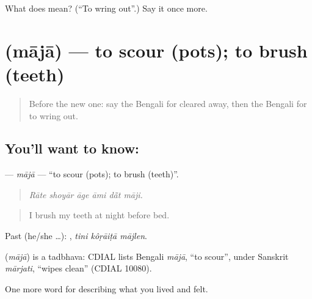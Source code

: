 \begin{tcolorbox}[breakable,colback=teal!4,colframe=teal!35!black,title={Before you move on}]
What does  mean? (\textquotedblleft{}To wring out\textquotedblright{}.) Say it once more.
\end{tcolorbox}
\section[\texorpdfstring{\bn{মাজা} (mājā)}{মাজা (mājā)}]{ (mājā) — to scour (pots); to brush (teeth)}

\label{lesson:BN-C510-maja}



\begin{quote}
Before the new one: say the Bengali for cleared away, then the Bengali for to wring out.
\end{quote}

\subsection*{You'll want to know: }
\textbf{} — \emph{mājā} — \textquotedblleft{}to scour (pots); to brush (teeth)\textquotedblright{}.

\begin{quote}
     
\end{quote}

\begin{quote}
\emph{Rāte shoyār āge āmi dā̃t māji.}
\end{quote}

\begin{quote}
I brush my teeth at night before bed.
\end{quote}

Past (he/she …):   , \emph{tini kôṛāiṭā mājlen}.

\begin{cousinweb}
\textbf{} (\emph{mājā}) is a tadbhava: CDIAL lists Bengali \emph{mājā}, \textquotedblleft{}to scour\textquotedblright{}, under Sanskrit \emph{mārjati}, \textquotedblleft{}wipes clean\textquotedblright{} (CDIAL 10080).
\end{cousinweb}

\begin{grammarlens}[title={What you've built}]
One more word for describing what you lived and felt.
\end{grammarlens}

